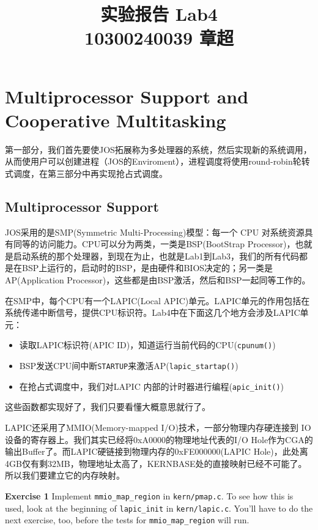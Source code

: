 \documentclass[11pt]{article}
\begin{document}
\title{\textbf{\huge{实验报告 Lab4}}\\
10300240039 章超}
\maketitle
\section{Multiprocessor Support and Cooperative Multitasking}
第一部分，我们首先要使JOS拓展称为多处理器的系统，然后实现新的系统调用，从而使用户可以创建进程（JOS的Enviroment），进程调度将使用round-robin轮转式调度，在第三部分中再实现抢占式调度。
\subsection{Multiprocessor Support}
JOS采用的是SMP(Symmetric Multi-Processing)模型：每一个 CPU 对系统资源具有同等的访问能力。CPU可以分为两类，一类是BSP(BootStrap Processor)，也就是启动系统的那个处理器，到现在为止，也就是Lab1到Lab3，我们的所有代码都是在BSP上运行的，启动时的BSP，是由硬件和BIOS决定的；另一类是AP(Application Processor)，这些都是由BSP激活，然后和BSP一起同等工作的。

在SMP中，每个CPU有一个LAPIC(Local APIC)单元。LAPIC单元的作用包括在系统传递中断信号，提供CPU标识符。Lab4中在下面这几个地方会涉及LAPIC单元： 
\begin{itemize}
\item 读取LAPIC标识符(APIC ID)，知道运行当前代码的CPU(\lstinline|cpunum()|)
\item BSP发送CPU间中断\lstinline|STARTUP|来激活AP(\lstinline|lapic_startap()|)
\item 在抢占式调度中，我们对LAPIC 内部的计时器进行编程(\lstinline|apic_init()|)
\end{itemize}
这些函数都实现好了，我们只要看懂大概意思就行了。

LAPIC还采用了MMIO(Memory-mapped I/O)技术，一部分物理内存硬连接到 IO 设备的寄存器上。我们其实已经将0xA0000的物理地址代表的I/O Hole作为CGA的输出Buffer了。而LAPIC硬链接到物理内存的0xFE000000(LAPIC Hole)，此处离4GB仅有剩32MB，物理地址太高了，KERNBASE处的直接映射已经不可能了。所以我们要建立它的内存映射。

\begin{framed}
\noindent\textbf{Exercise 1} Implement \lstinline|mmio_map_region| in \lstinline|kern/pmap.c|. To see how this is used, look at the beginning of \lstinline|lapic_init| in \lstinline|kern/lapic.c|. You'll have to do the next exercise, too, before the tests for \lstinline|mmio_map_region| will run.
\end{framed}
\end{document}
